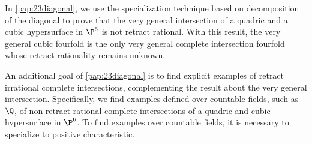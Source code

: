 In \cref{pap:23diagonal}, we use the specialization technique based on decomposition of the diagonal to prove that the very general intersection of a quadric and a cubic hypersurface in $\P^6$ is not retract rational. With this result, the very general cubic fourfold is the only very general complete intersection fourfold whose retract rationality remains unknown.

 An additional goal of \cref{pap:23diagonal} is to find explicit examples of retract irrational complete intersections, complementing the result about the very general intersection. Specifically, we find examples defined over countable fields, such as $\Q$, of non retract rational complete intersections of a quadric and cubic hypersurface in $\P^6$. To find examples over countable fields, it is necessary to specialize to positive characteristic.

